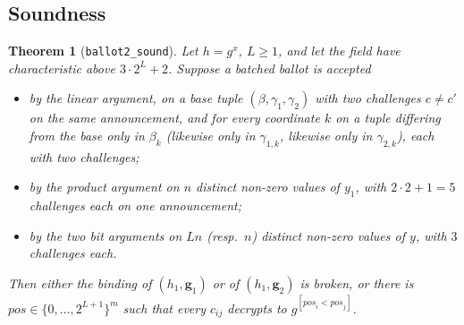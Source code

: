 \documentclass[11pt,a4paper]{article}
\newcommand{\pos}{\mathit{pos}}
\newcommand{\rocq}[1]{\texttt{#1}}
\newtheorem{theorem}{Theorem}[section]
\theoremstyle{remark}
\begin{document}
\subsection{Soundness}
\begin{theorem}[\rocq{ballot2\_sound}]\label{thm:b2sound}
Let $h = g^x$, $L \ge 1$, and let the field have characteristic above $3
\cdot 2^L + 2$. Suppose a batched ballot is accepted
\begin{itemize}[nosep]
  \item by the linear argument, on a base tuple $(\beta, \gamma_1,
  \gamma_2)$ with two challenges $c \ne c'$ on the same announcement, and
  for every coordinate $k$ on a tuple differing from the base only in
  $\beta_k$ (likewise only in $\gamma_{1,k}$, likewise only in
  $\gamma_{2,k}$), each with two challenges;
  \item by the product argument on $n$ distinct non-zero values of $y_1$,
  with $2 \cdot 2 + 1 = 5$ challenges each on one announcement;
  \item by the two bit arguments on $Ln$ (resp.\ $n$) distinct non-zero
  values of $y$, with $3$ challenges each.
\end{itemize}
Then either the binding of $(h_1, \mathbf{g}_1)$ or of $(h_1,
\mathbf{g}_2)$ is broken, or there is $\pos \in \{0, \ldots, 2^{L+1}\}^m$
such that every $c_{ij}$ decrypts to $g^{[\pos_i < \pos_j]}$.
\end{theorem}
\end{document}
